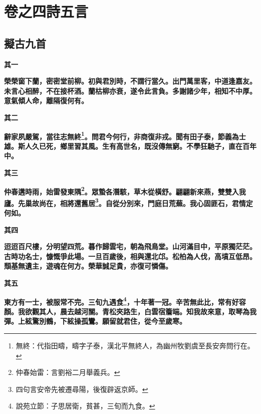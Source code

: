 \chapter{卷之四\hspace{1ex}詩五言}

\section{擬古九首}

\begin{quoting}\textbf{其一}\end{quoting}

\textbf{榮榮窗下蘭，密密堂前柳。初與君別時，不謂行當久。出門萬里客，中道逢嘉友。未言心相醉，不在接杯酒。蘭枯柳亦衰，遂令此言負。多謝諸少年，相知不中厚。意氣傾人命，離隔復何有。}

\begin{quoting}\textbf{其二}\end{quoting}

\textbf{辭家夙嚴駕，當往志無終\footnote{無終：代指田疇，疇字子泰，漢北平無終人，為幽州牧劉虞至長安奔問行在。}。問君今何行，非商復非戎。聞有田子泰，節義為士雄。斯人久已死，鄉里習其風。生有高世名，既沒傳無窮。不學狂馳子，直在百年中。}

\begin{quoting}\textbf{其三}\end{quoting}

\textbf{仲春遘時雨，始雷發東隅\footnote{仲春始雷：言劉裕二月舉義兵。}。眾蟄各潛駭，草木從橫舒。翩翩新來燕，雙雙入我廬。先巢故尚在，相將還舊居\footnote{四句言安帝先被遷尋陽，後復辟返京師。}。自從分別來，門庭日荒蕪。我心固匪石，君情定何如。}

\begin{quoting}\textbf{其四}\end{quoting}

\textbf{迢迢百尺樓，分明望四荒。暮作歸雲宅，朝為飛鳥堂。山河滿目中，平原獨茫茫。古時功名士，慷慨爭此場。一旦百歲後，相與還北邙。松柏為人伐，高墳互低昂。頹基無遺主，遊魂在何方。榮華誠足貴，亦復可憐傷。}

\begin{quoting}\textbf{其五}\end{quoting}

\textbf{東方有一士，被服常不完。三旬九遇食\footnote{說苑立節：子思居衛，貧甚，三旬而九食。}，十年著一冠。辛苦無此比，常有好容顏。我欲觀其人，晨去越河關。青松夾路生，白雲宿簷端。知我故來意，取琴為我彈。上絃驚別鶴，下絃操孤鸞。願留就君住，從今至歲寒。}

